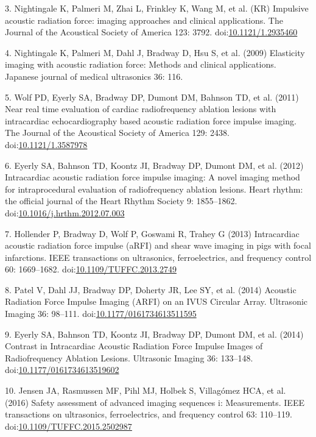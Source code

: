 \documentclass[letterpaper,10pt,english]{sphinxmanual}
\begin{document}
3. Nightingale K, Palmeri M, Zhai L, Frinkley K, Wang M, et al. (KR)
Impulsive acoustic radiation force: imaging approaches and clinical
applications. The Journal of the Acoustical Society of America 123:
3792. doi:\href{http://dx.doi.org/10.1121/1.2935460}{10.1121/1.2935460}

4. Nightingale K, Palmeri M, Dahl J, Bradway D, Hsu S, et al. (2009)
Elasticity imaging with acoustic radiation force: Methods and clinical
applications. Japanese journal of medical ultrasonics 36: 116.

5. Wolf PD, Eyerly SA, Bradway DP, Dumont DM, Bahnson TD, et al. (2011)
Near real time evaluation of cardiac radiofrequency ablation lesions
with intracardiac echocardiography based acoustic radiation force
impulse imaging. The Journal of the Acoustical Society of America 129:
2438. doi:\href{http://dx.doi.org/10.1121/1.3587978}{10.1121/1.3587978}

6. Eyerly SA, Bahnson TD, Koontz JI, Bradway DP, Dumont DM, et al.
(2012) Intracardiac acoustic radiation force impulse imaging: A novel
imaging method for intraprocedural evaluation of radiofrequency ablation
lesions. Heart rhythm: the official journal of the Heart Rhythm Society
9: 1855–1862.
doi:\href{http://dx.doi.org/10.1016/j.hrthm.2012.07.003}{10.1016/j.hrthm.2012.07.003}

7. Hollender P, Bradway D, Wolf P, Goswami R, Trahey G (2013)
Intracardiac acoustic radiation force impulse (aRFI) and shear wave
imaging in pigs with focal infarctions. IEEE transactions on
ultrasonics, ferroelectrics, and frequency control 60: 1669–1682.
doi:\href{http://dx.doi.org/10.1109/TUFFC.2013.2749}{10.1109/TUFFC.2013.2749}

8. Patel V, Dahl JJ, Bradway DP, Doherty JR, Lee SY, et al. (2014)
Acoustic Radiation Force Impulse Imaging (ARFI) on an IVUS Circular
Array. Ultrasonic Imaging 36: 98–111.
doi:\href{http://dx.doi.org/10.1177/0161734613511595}{10.1177/0161734613511595}

9. Eyerly SA, Bahnson TD, Koontz JI, Bradway DP, Dumont DM, et al.
(2014) Contrast in Intracardiac Acoustic Radiation Force Impulse Images
of Radiofrequency Ablation Lesions. Ultrasonic Imaging 36: 133–148.
doi:\href{http://dx.doi.org/10.1177/0161734613519602}{10.1177/0161734613519602}

10. Jensen JA, Rasmussen MF, Pihl MJ, Holbek S, Villagómez HCA, et al.
(2016) Safety assessment of advanced imaging sequences i: Measurements.
IEEE transactions on ultrasonics, ferroelectrics, and frequency control
63: 110–119.
doi:\href{http://dx.doi.org/10.1109/TUFFC.2015.2502987}{10.1109/TUFFC.2015.2502987}
\end{document}
